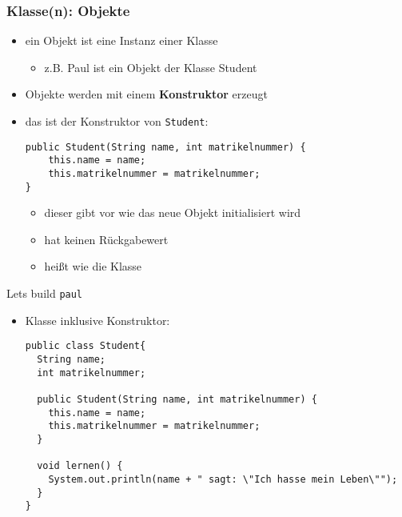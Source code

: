 \documentclass{../../presentation}
\begin{document}
\begin{frame}[fragile]
	\frametitle{Klasse(n): Objekte}
	\begin{itemize}
		\item ein Objekt ist eine Instanz einer Klasse
		      \begin{itemize}
			      \item[\textbullet] z.B. Paul ist ein Objekt der Klasse Student
		      \end{itemize}
		\item<2-> Objekte werden mit einem \textbf{Konstruktor} erzeugt
		\item<3-> das ist der Konstruktor von \texttt{Student}:
		      \begin{verbatim}
public Student(String name, int matrikelnummer) {
	this.name = name;
	this.matrikelnummer = matrikelnummer;
}
      \end{verbatim}
		      \begin{itemize}
			      \item<4->[\textbullet]dieser gibt vor wie das neue Objekt initialisiert wird
			      \item<5->[\textbullet]hat keinen Rückgabewert
			      \item<6->[\textbullet]heißt wie die Klasse
		      \end{itemize}
	\end{itemize}
\end{frame}

\begin{frame}[fragile]{Let\textquotesingle s build \texttt{paul}}
	\begin{itemize}
		\item Klasse inklusive Konstruktor:

		      \begin{verbatim}
public class Student{
  String name;
  int matrikelnummer;

  public Student(String name, int matrikelnummer) {
    this.name = name;
    this.matrikelnummer = matrikelnummer;
  }

  void lernen() {
    System.out.println(name + " sagt: \"Ich hasse mein Leben\"");
  }
}
  \end{verbatim}
	\end{itemize}
\end{frame}
\end{document}
